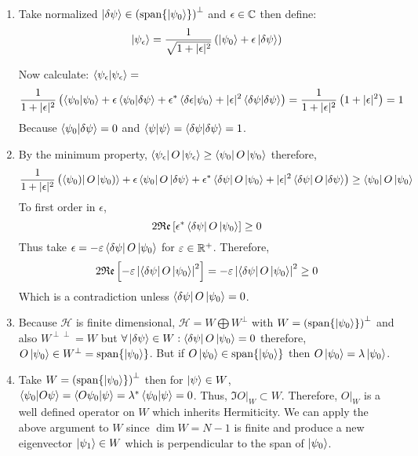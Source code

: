 \documentclass[12pt]{extarticle}
\begin{document}
\begin{enumerate}

\item Take normalized $\left| \delta \psi \right> \in \left( \mathrm{span}\! \left\{\left| \psi_0 \right> \right\} \right)^\perp$ and $\epsilon \in \mathbb{C}$ then define: \[\left| \psi_\epsilon \right> = \frac{1}{\sqrt{1 + |\epsilon|^2}} \left( \left| \psi_0 \right> + \epsilon \left| \delta \psi \right> \right) \] 

Now calculate: $\left< \psi_\epsilon | \psi_\epsilon \right> = $ \[ \frac{1}{1+|\epsilon|^2} \left(\left< \psi_0 | \psi_0 \right> + \epsilon \left< \psi_0 | \delta \psi \right> + \epsilon^* \left< \delta \epsilon | \psi_0 \right> + | \epsilon |^2 \left< \delta \psi | \delta \psi \right> \right) = \frac{1}{1 + | \epsilon |^2} \left(1 + | \epsilon |^2 \right) = 1\]
Because $\left< \psi_0 | \delta\psi \right> = 0$ and $\left< \psi | \psi \right> = \left< \delta \psi | \delta \psi \right> = 1$. \\

\item By the minimum property, $\left< \psi_\epsilon \right| O \left| \psi_\epsilon \right> \ge \left< \psi_0 \right| O \left| \psi_0 \right>$ therefore, 
\[ \frac{1}{1+|\epsilon|^2} \left( \left< \psi_0) \right| O \left| \psi_0) \right> + \epsilon \left< \psi_0 \right|O \left| \delta\psi \right> + \epsilon^* \left< \delta\psi \right|O\left| \psi_0 \right> + |\epsilon|^2 \left< \delta \psi \right| O \left| \delta \psi \right>  \right) \ge \left< \psi_0 \right| O \left| \psi_0 \right> \]
To first order in $\epsilon$, \[2 \mathfrak{Re}\left[ \epsilon^* \left< \delta\psi \right|O\left| \psi_0 \right> \right] \ge 0 \] Thus take $\epsilon = - \varepsilon \left< \delta\psi \right|O\left| \psi_0 \right>$ for $\varepsilon \in \mathbb{R}^+$. Therefore, \[2 \mathfrak{Re}\left[ - \varepsilon \left| \left< \delta\psi \right|O\left| \psi_0 \right> \right|^2 \right] =  - \varepsilon \left| \left< \delta\psi \right|O\left| \psi_0 \right> \right|^2 \ge 0\] Which is a contradiction unless $\left< \delta\psi \right|O\left| \psi_0 \right> = 0$. \\

\item Because $\mathcal{H}$ is finite dimensional, $\mathcal{H} = W \bigoplus W^\perp$ with $W = \left( \mathrm{span}\! \left\{\left| \psi_0 \right> \right\} \right)^{\perp}$ and also $W^{\perp \perp} = W$ but $\forall \left| \delta \psi \right> \in W : \left< \delta \psi \right| O \left| \psi_0 \right> = 0$ therefore, $O\left| \psi_0 \right> \in W^{\perp} = \mathrm{span}\! \left\{\left| \psi_0 \right> \right\}$. But if $O\left| \psi_0 \right> \in \mathrm{span}\! \left\{\left| \psi_0 \right> \right\}$ then $O\left| \psi_0 \right> = \lambda \left| \psi_0 \right>$.

\item Take $W = \left( \mathrm{span}\! \left\{\left| \psi_0 \right> \right\} \right)^{\perp}$ then for $\left| \psi \right> \in W$, $\left< \psi_0 | O \psi \right> = \left< O \psi_0 | \psi \right> = \lambda^* \left< \psi_0 | \psi \right> = 0$. Thus, $\Im{O} |_W \subset W$. Therefore, $O|_W$ is a well defined operator on $W$ which inherits Hermiticity. We can apply the above argument to $W$ since $\dim{W} = N-1$ is finite and produce a new eigenvector $\left| \psi_1 \right> \in W$ which is perpendicular to the span of $\left| \psi_0 \right>$.


\end{enumerate}
\end{document}
